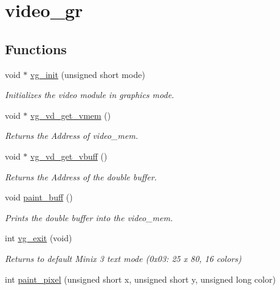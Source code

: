\hypertarget{group__video__gr}{}\section{video\+\_\+gr}
\label{group__video__gr}
\subsection*{Functions}
\begin{DoxyCompactItemize}
\item 
void $\ast$ \hyperlink{group__video__gr_gacef21667c79365d57a084bed994c2189}{vg\+\_\+init} (unsigned short mode)
\begin{DoxyCompactList}\small\item\em Initializes the video module in graphics mode. \end{DoxyCompactList}\item 
void $\ast$ \hyperlink{group__video__gr_ga5ad1cc85a8dce3ce1a7d3e90e6ff88d3}{vg\+\_\+vd\+\_\+get\+\_\+vmem} ()
\begin{DoxyCompactList}\small\item\em Returns the Address of video\+\_\+mem. \end{DoxyCompactList}\item 
void $\ast$ \hyperlink{group__video__gr_ga3a176fda764c03218b5c20797f8b255e}{vg\+\_\+vd\+\_\+get\+\_\+vbuff} ()
\begin{DoxyCompactList}\small\item\em Returns the Address of the double buffer. \end{DoxyCompactList}\item 
void \hyperlink{group__video__gr_gab42788264b43ce014d787544fc12fdc6}{paint\+\_\+buff} ()
\begin{DoxyCompactList}\small\item\em Prints the double buffer into the video\+\_\+mem. \end{DoxyCompactList}\item 
int \hyperlink{group__video__gr_ga42f593e6656f1a978315aff02b1bcebf}{vg\+\_\+exit} (void)
\begin{DoxyCompactList}\small\item\em Returns to default Minix 3 text mode (0x03\+: 25 x 80, 16 colors) \end{DoxyCompactList}\item 
int \hyperlink{group__video__gr_gad194f7c3fabb1d2d981014ca7df5831f}{paint\+\_\+pixel} (unsigned short x, unsigned short y, unsigned long color)

\end{DoxyCompactItemize}
